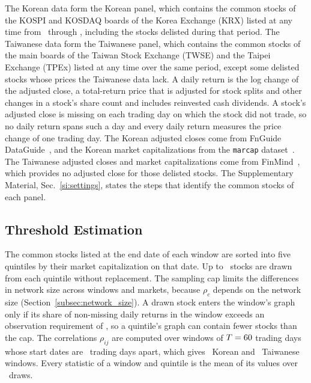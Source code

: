 \documentclass[a4paper,fleqn]{cas-sc}
\begin{document}
The Korean data form the Korean panel, which contains the common stocks of the KOSPI and KOSDAQ boards of the Korea Exchange (KRX) listed at any time from \paperSampleStart\ through \paperSampleEnd, including the stocks delisted during that period. The Taiwanese data form the Taiwanese panel, which contains the common stocks of the main boards of the Taiwan Stock Exchange (TWSE) and the Taipei Exchange (TPEx) listed at any time over the same period, except some delisted stocks whose prices the Taiwanese data lack. A daily return is the log change of the adjusted close, a total-return price that is adjusted for stock splits and other changes in a stock's share count and includes reinvested cash dividends. A stock's adjusted close is missing on each trading day on which the stock did not trade, so no daily return spans such a day and every daily return measures the price change of one trading day. The Korean adjusted closes come from FnGuide DataGuide~\citep{fnguide2026dataguide}, and the Korean market capitalizations from the \texttt{marcap} dataset~\citep{marcap2024}. The Taiwanese adjusted closes and market capitalizations come from FinMind~\citep{finmind2026}, which provides no adjusted close for those delisted stocks. The Supplementary Material, Sec.~\ref{si:settings}, states the steps that identify the common stocks of each panel.

\subsection{Threshold Estimation}\label{subsec:methods}

The common stocks listed at the end date of each window are sorted into five quintiles by their market capitalization on that date. Up to \paperPerQuintile\ stocks are drawn from each quintile without replacement. The sampling cap limits the differences in network size across windows and markets, because $\rho_c$ depends on the network size (Section~\ref{subsec:network_size}). A drawn stock enters the window's graph only if its share of non-missing daily returns in the window exceeds an observation requirement of \minValidFractionPct, so a quintile's graph can contain fewer stocks than the cap. The correlations $\rho_{ij}$ are computed over windows of $T = 60$ trading days whose start dates are \paperStepDays\ trading days apart, which gives \nWindowsHeadline\ Korean and \nWindowsTw\ Taiwanese windows. Every statistic of a window and quintile is the mean of its values over \nDrawSeeds\ draws.
\end{document}
